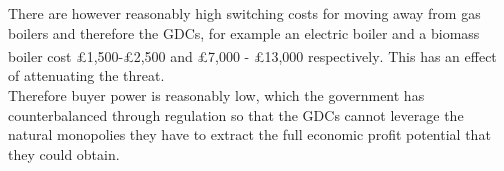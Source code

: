 \documentclass[11pt]{article}		%
\newcommand{\supercite}[1]{\textsuperscript{\cite{#1}}}		%
\begin{document}
                There are however reasonably high switching costs for moving away from gas boilers and therefore the GDCs, for example an electric boiler and a biomass boiler cost £1,500-£2,500 and £7,000 - £13,000 respectively\supercite{boiler_cost}. This has an effect of attenuating the threat.
                \\
                \hspace*{2ex}
             Therefore buyer power is reasonably low, which the government has counterbalanced through regulation so that the GDCs cannot leverage the natural monopolies they have to extract the full economic profit potential that they could obtain.
                 
                
                
            
               
\end{document}

